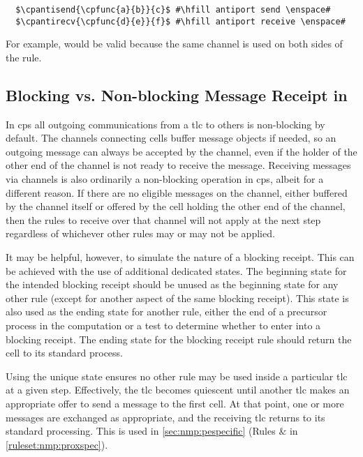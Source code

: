 \lstset{xleftmargin=.5in, xrightmargin=.5in} 
\begin{lstlisting}
  $\cpantisend{\cpfunc{a}{b}}{c}$ #\hfill antiport send \enspace#
  $\cpantirecv{\cpfunc{d}{e}}{f}$ #\hfill antiport receive \enspace#
\end{lstlisting}

For example,  would be valid because the same channel is used on both sides of the rule.

\subsection{\label{sec:cps:blocking}Blocking vs. Non-blocking Message Receipt in }

In \gls{cps} all outgoing communications from a \gls{tlc} to others is non-blocking by default.  The channels connecting cells buffer message objects if needed, so an outgoing message can always be accepted by the channel, even if the holder of the other end of the channel is not ready to receive the message.  Receiving messages via channels is also ordinarily a non-blocking operation in \gls{cps}, albeit for a different reason.  If there are no eligible messages on the channel, either buffered by the channel itself or offered by the cell holding the other end of the channel, then the rules to receive over that channel will not apply at the next step regardless of whichever other rules may or may not be applied.

It may be helpful, however, to simulate the nature of a blocking receipt.  This can be achieved with the use of additional dedicated states.  The beginning state for the intended blocking receipt should be unused as the beginning state for any other rule (except for another aspect of the same blocking receipt).  This state is also used as the ending state for another rule, either the end of a precursor process in the computation or a test to determine whether to enter into a blocking receipt.  The ending state for the blocking receipt rule should return the cell to its standard process.

Using the unique state ensures no other rule may be used inside a particular \gls{tlc} at a given step.  Effectively, the \gls{tlc} becomes quiescent until another \gls{tlc} makes an appropriate offer to send a message to the first cell.  At that point, one or more messages are exchanged as appropriate, and the receiving \gls{tlc} returns to its standard processing.  This is used \eg{} in \cref{sec:nmp:pespecific} (Rules  \&  in \vref{ruleset:nmp:proxspec}).

